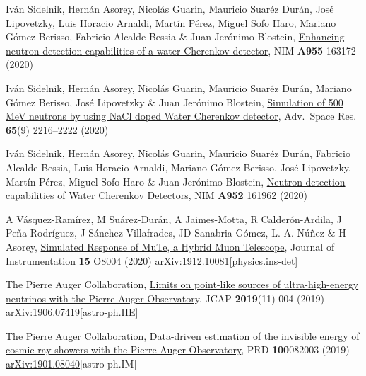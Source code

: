 \begin{etaremune}
\item {} Iván Sidelnik, Hernán Asorey, Nicolás Guarin, Mauricio Suaréz Durán, José Lipovetzky, Luis Horacio Arnaldi, Martín Pérez, Miguel Sofo Haro, Mariano Gómez Berisso, Fabricio Alcalde Bessia \& Juan Jerónimo Blostein, \href{https://doi.org/10.1016/j.nima.2019.163172}{{Enhancing neutron detection capabilities of a water Cherenkov detector}}, NIM {\textbf{A955}} 163172 (2020) %
	
\item {} Iván Sidelnik, Hernán Asorey, Nicolás Guarin, Mauricio Suaréz Durán, Mariano Gómez Berisso, José Lipovetzky \& Juan Jerónimo Blostein, \href{https://doi.org/10.1016/j.asr.2020.02.024}{{Simulation of 500 MeV neutrons by using NaCl doped Water Cherenkov detector}}, Adv.\ Space Res. {\textbf{65}}(9) 2216--2222 (2020) %

\item {} Iván Sidelnik, Hernán Asorey, Nicolás Guarin, Mauricio Suaréz Durán, Fabricio Alcalde Bessia, Luis Horacio Arnaldi, Mariano Gómez Berisso, José Lipovetzky, Martín Pérez, Miguel Sofo Haro \& Juan Jerónimo Blostein, \href{https://doi.org/10.1016/j.nima.2019.03.017}{{Neutron detection capabilities of Water Cherenkov Detectors}}, NIM {\textbf{A952}} 161962 (2020) %

\item {} A Vásquez-Ramírez, M Suárez-Durán, A Jaimes-Motta, R Calderón-Ardila, J Peña-Rodríguez, J Sánchez-Villafrades, JD Sanabria-Gómez, L. A. Núñez \& H Asorey, \href{https://doi.org/10.1088/1748-0221/15/08/P08004}{{Simulated Response of MuTe, a Hybrid Muon Telescope}}, Journal of Instrumentation {\textbf{15}} O8004 (2020) \href{https://arxiv.org/abs/1912.10081}{arXiv:1912.10081}[physics.ins-det]

\item {}The Pierre Auger Collaboration, \href{https://doi.org/10.1088/1475-7516/2019/11/004}{{Limits on point-like sources of ultra-high-energy neutrinos with the Pierre Auger Observatory}}, JCAP {\textbf{2019}}(11) 004 (2019) \href{https://arxiv.org/abs/1906.07419}{arXiv:1906.07419}[astro-ph.HE]

\item {}The Pierre Auger Collaboration, \href{https://doi.org/10.1103/PhysRevD.100.082003}{Data-driven estimation of the invisible energy of cosmic ray showers with the Pierre Auger Observatory}, PRD {\textbf{100}}082003 (2019) \href{https://arxiv.org/abs/1901.08040}{arXiv:1901.08040}[astro-ph.IM]


\end{etaremune}
